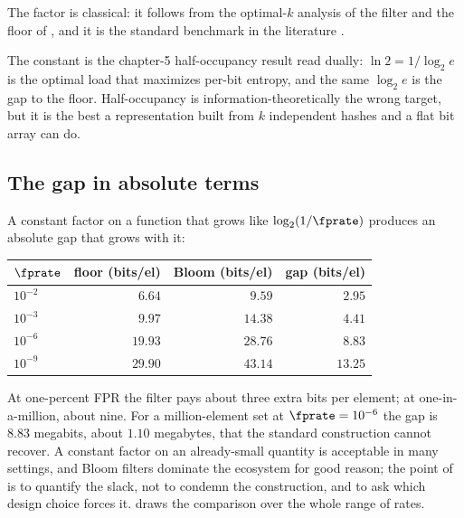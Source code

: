 The factor is classical: it follows from the optimal-$k$ analysis of the
filter and the floor of \textcite{carter-et-al-1978}, and it is the standard
benchmark in the literature \parencite{broder-mitzenmacher-2004}.

The constant is the chapter-5 half-occupancy result read dually: $\ln 2 =
1/\log_2 e$ is the optimal load that maximizes per-bit entropy, and the same
$\log_2 e$ is the gap to the floor. Half-occupancy is information-theoretically
the wrong target, but it is the best a representation built from $k$
independent hashes and a flat bit array can do.

\subsection*{The gap in absolute terms}

A constant factor on a function that grows like $\log_2(1/\fprate)$ produces an
absolute gap that grows with it:
\begin{center}
\begin{tabular}{l|rrr}
\hline
  $\fprate$ & floor (bits/el) & Bloom (bits/el) & gap (bits/el) \\
\hline
  $10^{-2}$ & $6.64$  & $9.59$  & $2.95$ \\
  $10^{-3}$ & $9.97$  & $14.38$ & $4.41$ \\
  $10^{-6}$ & $19.93$ & $28.76$ & $8.83$ \\
  $10^{-9}$ & $29.90$ & $43.14$ & $13.25$ \\
\hline
\end{tabular}
\end{center}
At one-percent FPR the filter pays about three extra bits per element; at
one-in-a-million, about nine. For a million-element set at $\fprate = 10^{-6}$
the gap is $8.83$ megabits, about $1.10$ megabytes, that the standard
construction cannot recover. A constant factor on an already-small quantity is
acceptable in many settings, and Bloom filters dominate the ecosystem for good
reason; the point of  is to quantify the slack, not
to condemn the construction, and to ask which design choice forces it.
 draws the comparison over the whole range of
rates.

